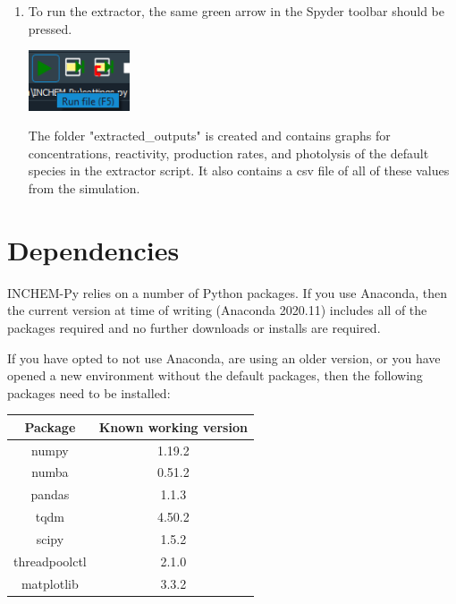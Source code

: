\documentclass[a4paper]{refart}
\begin{document}
{\begin{minipage}{\fullwidth}
\begin{enumerate}
    \item To run the extractor, the same green arrow in the Spyder toolbar should be pressed.
                
            \vspace{1em}
            \begin{minipage}[t]{\linewidth}
                \centering
                \includegraphics[width = 3cm]{run.png}
            \end{minipage}
          
          The folder "extracted\_outputs" is created and contains graphs for concentrations, reactivity, production rates, and photolysis of the default species in the extractor script. It also contains a csv file of all of these values from the simulation.
\end{enumerate}
\end{minipage}}

\newpage
\section{Dependencies}


INCHEM-Py relies on a number of Python packages. If you use Anaconda, then the current version at time of writing (Anaconda 2020.11) includes all of the packages required and no further downloads or installs are required.

If you have opted to not use Anaconda, are using an older version, or you have opened a new environment without the default packages, then the following packages need to be installed:
\begin{table}[h!]
    \centering
    \begin{tabular}{c|c}
        Package & Known working version \\
        \hline
        numpy & 1.19.2 \\
        numba & 0.51.2 \\
        pandas & 1.1.3 \\
        tqdm & 4.50.2 \\
        scipy & 1.5.2 \\
        threadpoolctl & 2.1.0 \\
        matplotlib & 3.3.2 \\
    \end{tabular}
\end{table}
\end{document}
